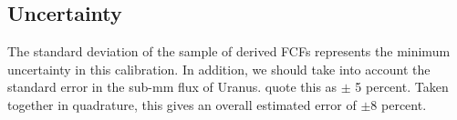 \documentclass[twocolumn,times]{aastex6}
\begin{document}
\subsection{Uncertainty}

The standard deviation of the sample of derived FCFs represents the
minimum uncertainty in this calibration. In addition, we should take
into account the standard error in the sub-mm flux of
Uranus. \citet{Dempsey2013} quote this as $\pm$ 5 percent. Taken
together in quadrature, this gives an overall estimated error of
$\pm$8 percent.









\end{document}
